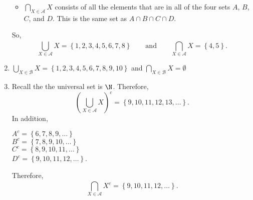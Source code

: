 \begin{enumerate}
\begin{itemize}
\item $\bigcap\limits_{X \in \mathscr{A}}^{}X$ consists of all the elements that are in all of the four sets $A$, $B$, $C$, and $D$.  This is the same set as  $A \cap B \cap C \cap D$.
\end{itemize}  
So,
\[
\bigcup_{X \in \mathscr{A}}^{}X = \left\{1, 2, 3, 4, 5, 6, 7, 8 \right\} \qquad \text{and} \qquad
\bigcap_{X \in \mathscr{A}}^{}X = \left\{4, 5 \right\}.
\]

\item $\bigcup\limits_{X \in \mathscr{B}}^{}X = \left\{1, 2, 3, 4, 5, 6, 7, 8, 9, 10 \right\}$ \qquad and \qquad $\bigcap_{X \in \mathscr{B}}^{}X = \emptyset$

\item Recall the the universal set is $\N$.  Therefore,
\[
\left( \bigcup_{X \in \mathscr{A}}^{}X \right)^c = \left\{9, 10, 11, 12, 13, \ldots \right\}.
\]
In addition,
\begin{multicols}{2}
$A^c = \left\{6, 7, 8, 9, \ldots \right\}$ \\
$B^c = \left\{7, 8, 9, 10, \ldots \right\}$ \\
$C^c = \left\{8, 9, 10, 11, \ldots \right\}$ \\
$D^c = \left\{9, 10, 11, 12, \ldots \right\}$. 
\end{multicols}
Therefore,
\[
\bigcap_{X \in \mathscr{A}}^{}X^c = \left\{9, 10, 11, 12, \ldots \right\}.
\]
\end{enumerate}
\hbreak




